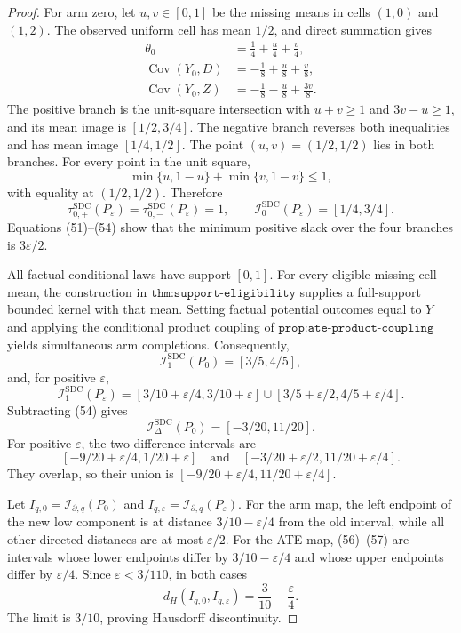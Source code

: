 \documentclass{article}
\begin{document}
\begin{proof}
For arm zero, let \(u,v\in[0,1]\) be the missing means in cells \((1,0)\) and \((1,2)\).  The observed uniform cell has mean \(1/2\), and direct summation gives
\[
 \begin{aligned}
 \theta_0&=\frac14+\frac{u}{4}+\frac{v}{4},\\
 \operatorname{Cov}(Y_0,D)&=-\frac18+\frac{u}{8}+\frac{v}{8},\\
 \operatorname{Cov}(Y_0,Z)&=-\frac18-\frac{u}{8}+\frac{3v}{8}.
 \end{aligned}                                                               \tag{53}
\]
The positive branch is the unit-square intersection with \(u+v\ge1\) and \(3v-u\ge1\), and its mean image is \([1/2,3/4]\).  The negative branch reverses both inequalities and has mean image \([1/4,1/2]\).  The point \((u,v)=(1/2,1/2)\) lies in both branches.  For every point in the unit square,
\[
 \min\{u,1-u\}+\min\{v,1-v\}\le1,
\]
with equality at \((1/2,1/2)\).  Therefore
\[
 \tau_{0,+}^{\mathrm{SDC}}(P_\varepsilon)
 =\tau_{0,-}^{\mathrm{SDC}}(P_\varepsilon)=1,
 \qquad
 \mathcal I_0^{\mathrm{SDC}}(P_\varepsilon)=[1/4,3/4].                       \tag{54}
\]
Equations (51)--(54) show that the minimum positive slack over the four branches is \(3\varepsilon/2\).

All factual conditional laws have support \([0,1]\).  For every eligible missing-cell mean, the construction in \(\texttt{thm:support-eligibility}\) supplies a full-support bounded kernel with that mean.  Setting factual potential outcomes equal to \(Y\) and applying the conditional product coupling of \(\texttt{prop:ate-product-coupling}\) yields simultaneous arm completions.  Consequently,
\[
 \mathcal I_1^{\mathrm{SDC}}(P_0)=[3/5,4/5],
\]
and, for positive \(\varepsilon\),
\[
 \mathcal I_1^{\mathrm{SDC}}(P_\varepsilon)
 =[3/10+\varepsilon/4,3/10+\varepsilon]
 \mathbin{\cup}[3/5+\varepsilon/2,4/5+\varepsilon/4].                       \tag{55}
\]
Subtracting (54) gives
\[
 \mathcal I_\Delta^{\mathrm{SDC}}(P_0)=[-3/20,11/20].                        \tag{56}
\]
For positive \(\varepsilon\), the two difference intervals are
\[
 [-9/20+\varepsilon/4,1/20+\varepsilon]
 \quad\text{and}\quad
 [-3/20+\varepsilon/2,11/20+\varepsilon/4].                                  \tag{57}
\]
They overlap, so their union is \([-9/20+\varepsilon/4,11/20+\varepsilon/4]\).

Let \(I_{q,0}=\mathcal I_{\partial,q}(P_0)\) and \(I_{q,\varepsilon}=\mathcal I_{\partial,q}(P_\varepsilon)\).  For the arm map, the left endpoint of the new low component is at distance \(3/10-\varepsilon/4\) from the old interval, while all other directed distances are at most \(\varepsilon/2\).  For the ATE map, (56)--(57) are intervals whose lower endpoints differ by \(3/10-\varepsilon/4\) and whose upper endpoints differ by \(\varepsilon/4\).  Since \(\varepsilon<3/110\), in both cases
\[
 d_H(I_{q,0},I_{q,\varepsilon})
 =\frac3{10}-\frac{\varepsilon}{4}.                                           \tag{58}
\]
The limit is \(3/10\), proving Hausdorff discontinuity.


\end{proof}
\end{document}

